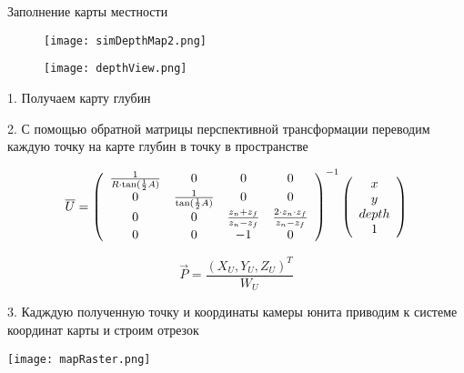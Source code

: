\begin{tslide}{Заполнение карты местности}

    \begin{wrapfigure}{l}{.3\linewidth}
    \texttt{[image: simDepthMap2.png]}

    \vspace{5mm}
    \texttt{[image: depthView.png]}
    \vspace{-2.5cm}
    \end{wrapfigure}

    1. Получаем карту глубин

    2. С помощью обратной матрицы перспективной трансформации
    переводим каждую точку на карте глубин в точку в пространстве

$$
\vec U = \left( \begin{array}{c c c c}
        \frac{1}{ R \cdot \tan( \frac{1}{2} A ) } & 0 & 0 & 0 \\
        0 & \frac{1}{ \tan( \frac{1}{2} A ) } & 0 & 0 \\
        0 & 0 & \frac{ z_{n} + z_{f} }{ z_{n}-z_{f} } & \frac{ 2 \cdot z_{n} \cdot z_{f} }{ z_{n} - z_{f} } \\
        0 & 0 & -1 & 0 \end{array} \right)^{-1} 
    \left( \begin{array}{c} x \\ y \\ depth \\ 1 \end{array} \right)
$$

$$\vec P = \frac{( X_U, Y_U, Z_U )^T}{ W_U } $$

    3. Кадждую полученную точку и координаты камеры юнита
    приводим к системе координат карты и строим отрезок

    \begin{center}
    \texttt{[image: mapRaster.png]}
    \end{center}

\end{tslide}

